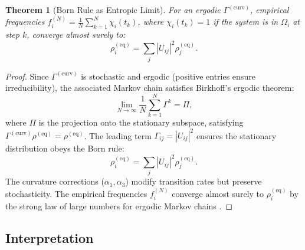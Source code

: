 \documentclass[12pt]{article}
\newtheorem{theorem}{Theorem}
\begin{document}
\begin{theorem}[Born Rule as Entropic Limit]
\label{thm:bornlimit}
For an ergodic \(\Gamma^{(\mathrm{curv})}\), empirical frequencies \(f_i^{(N)} = \frac{1}{N} \sum_{k=1}^N \chi_i(t_k)\), where \(\chi_i(t_k) = 1\) if the system is in \(\Omega_i\) at step \(k\), converge almost surely to:
\[
\rho_i^{(\mathrm{eq})} = \sum_j |U_{ij}|^2 \rho_j^{(\mathrm{eq})}.
\]
\end{theorem}

\begin{proof}
Since \(\Gamma^{(\mathrm{curv})}\) is stochastic and ergodic (positive entries ensure irreducibility), the associated Markov chain satisfies Birkhoff’s ergodic theorem:
\[
\lim_{N \to \infty} \frac{1}{N} \sum_{k=1}^N \Gamma^k = \Pi,
\]
where \(\Pi\) is the projection onto the stationary subspace, satisfying \(\Gamma^{(\mathrm{curv})} \rho^{(\mathrm{eq})} = \rho^{(\mathrm{eq})}\). The leading term \(\Gamma_{ij} = |U_{ij}|^2\) ensures the stationary distribution obeys the Born rule:
\[
\rho_i^{(\mathrm{eq})} = \sum_j |U_{ij}|^2 \rho_j^{(\mathrm{eq})}.
\]
The curvature corrections (\(\alpha_1, \alpha_3\)) modify transition rates but preserve stochasticity. The empirical frequencies \(f_i^{(N)}\) converge almost surely to \(\rho_i^{(\mathrm{eq})}\) by the strong law of large numbers for ergodic Markov chains \cite{Risken1996}.
\end{proof}

\subsection{Interpretation}
\end{document}
